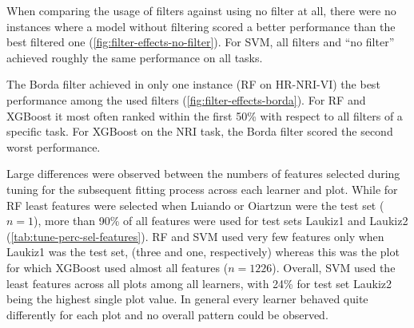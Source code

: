 \documentclass[remotesensing,article,submit,moreauthors,pdftex]{Definitions/mdpi}
\begin{document}
When comparing the usage of filters against using no filter at all, there were no instances where a model without filtering scored a better performance than the best filtered one (\autoref{fig:filter-effects-no-filter}).
For SVM, all filters and \enquote{no filter} achieved roughly the same performance on all tasks.

The Borda filter achieved in only one instance (RF on HR-NRI-VI) the best performance among the used filters (\autoref{fig:filter-effects-borda}).
For RF and XGBoost it most often ranked within the first 50\% with respect to all filters of a specific task.
For XGBoost on the NRI task, the Borda filter scored the second worst performance.

Large differences were observed between the numbers of features selected during tuning for the subsequent fitting process across each learner and plot.
While for RF least features were selected when Luiando or Oiartzun were the test set ($n = 1$), more than 90\% of all features were used for test sets Laukiz1 and Laukiz2 (\autoref{tab:tune-perc-sel-features}).
RF and SVM used very few features only when Laukiz1 was the test set, (three and one, respectively) whereas this was the plot for which XGBoost used almost all features ($n = 1226$).
Overall, SVM used the least features across all plots among all learners, with 24\% for test set Laukiz2 being the highest single plot value.
In general every learner behaved quite differently for each plot and no overall pattern could be observed.










\end{document}
